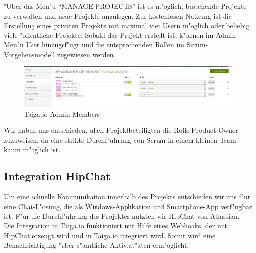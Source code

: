 \documentclass[a4paper, 11pt]{scrreprt}
\begin{document}
"Uber das Men"u "`MANAGE PROJECTS"' ist es m"oglich, bestehende Projekte zu verwalten und neue Projekte anzulegen. Zur kostenlosen Nutzung ist die Erstellung eines privaten Projekts mit maximal vier Usern m"oglich oder beliebig viele "offentliche Projekte. Sobald das Projekt erstellt ist, k"onnen im Admin-Men"u User hinzugef"ugt und die entsprechenden Rollen im Scrum-Vorgehensmodell zugewiesen werden.

\begin{figure} [H]
\begin{center}


\includegraphics[width=16cm]{members.png}
\caption{Taiga.io Admin-Members}

\end{center}
\end{figure}

Wir haben uns entschieden, allen Projektbeteiligten die Rolle Product Owner zuzuweisen, da eine strikte Durchf"uhrung von Scrum in einem kleinen Team kaum m"oglich ist.

\subsection{Integration HipChat}

Um eine schnelle Kommunikation innerhalb des Projekts entschieden wir uns f"ur eine Chat-L"osung, die als Windows-Applikation und Smartphone-App verf"ugbar ist. F"ur die Durchf"uhrung des Projektes nutzten wir HipChat von Atlassian. Die Integration in Taiga.io funktioniert mit Hilfe eines Webhooks, der mit HipChat erzeugt wird und in Taiga.io integriert wird. Somit wird eine Benachrichtigung "uber s"amtliche Aktiviat"aten erm"oglicht.
\end{document}

